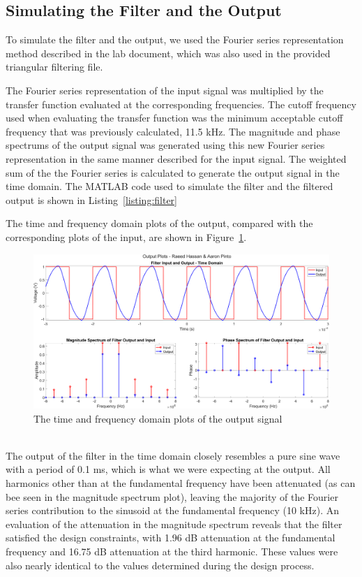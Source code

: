 \documentclass[12pt]{article}
\begin{document}
\subsection*{Simulating the Filter and the Output}
To simulate the filter and the output, we used the Fourier series representation method described in the lab document, which was also used in the provided triangular filtering file. 

The Fourier series representation of the input signal was multiplied by the transfer function evaluated at the corresponding frequencies. The cutoff frequency used when evaluating the transfer function was the minimum acceptable cutoff frequency that was previously calculated, 11.5 kHz. The magnitude and phase spectrums of the output signal was generated using this new Fourier series representation in the same manner described for the input signal. The weighted sum of the the Fourier series is calculated to generate the output signal in the time domain. The MATLAB code used to simulate the filter and the filtered output is shown in Listing~\ref{listing:filter}


The time and frequency domain plots of the output, compared with the corresponding plots of the input, are shown in Figure~\ref{fig:output}. 
\begin{figure}[h!]
    \includegraphics[width=\textwidth]{output.png}
    \caption{\label{fig:output} The time and frequency domain plots of the output signal}
\end{figure} \\
The output of the filter in the time domain closely resembles a pure sine wave with a period of 0.1 ms, which is what we were expecting at the output. All harmonics other than at the fundamental frequency have been attenuated (as can bee seen in the magnitude spectrum plot), leaving the majority of the Fourier series contribution to the sinusoid at the fundamental frequency (10 kHz). An evaluation of the attenuation in the magnitude spectrum reveals that the filter satisfied the design constraints, with 1.96 dB attenuation at the fundamental frequency and 16.75 dB attenuation at the third harmonic. These values were also nearly identical to the values determined during the design process.
\end{document}
